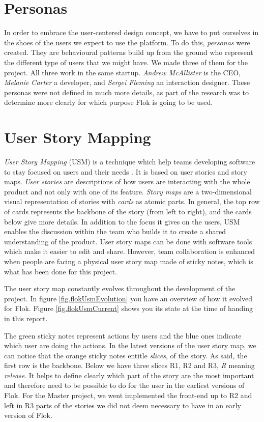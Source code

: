 \documentclass[a4paper,12pt, oneside]{article}
\begin{document}
\section{Personas}
In order to embrace the user-centered design concept, we have to put ourselves in the shoes of the users we expect to use the platform. To do this, \emph{personas} were created.
They are behavioural patterns build up from the ground who represent the different type of users that we might have.
We made three of them for the project.
All three work in the same startup. \emph{Andrew McAllister} is the CEO, \emph{Melanie Carter} a developer, and \emph{Sergei Fleming} an interaction designer.
These personas were not defined in much more details, as part of the research was to determine more clearly for which purpose Flok is going to be used.

\section{User Story Mapping}
\emph{User Story Mapping} (USM) is a technique which help teams developing software to stay focused on users and their needs \cite{patton2014user}.
It is based on user stories and story maps. \emph{User stories} are descriptions of how users are interacting with the whole product and not only with one of its feature. \emph{Story maps} are a two-dimensional visual representation of stories with \emph{cards} as atomic parts.
In general, the top row of cards represents the backbone of the story (from left to right), and the cards below give more details.
In addition to the focus it gives on the users, USM enables the discussion within the team who builds it to create a shared understanding of the product.
User story maps can be done with software tools which make it easier to edit and share. However, team collaboration is enhanced when people are facing a physical user story map made of sticky notes, which is what has been done for this project.

The user story map constantly evolves throughout the development of the project.
In figure \ref{fig.flokUsmEvolution} you have an overview of how it evolved for Flok.
Figure \ref{fig.flokUsmCurrent} shows you its state at the time of handing in this report.

The green sticky notes represent actions by users and the blue ones indicate which user are doing the actions.
In the latest versions of the user story map, we can notice that the orange sticky notes entitle \emph{slices}, of the story.
As said, the first row is the backbone.
Below we have three slices R1, R2 and R3, \emph{R} meaning \emph{release}.
It helps to define clearly which part of the story are the most important and therefore need to be possible to do for the user in the earliest versions of Flok. For the Master project, we went implemented the front-end up to R2 and left in R3 parts of the stories we did not deem necessary to have in an early version of Flok.
\end{document}
